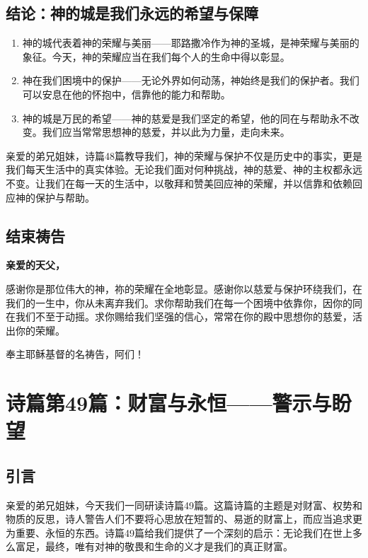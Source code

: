 \documentclass[a4paper, 12pt]{article}
\begin{document}
\subsection*{结论：神的城是我们永远的希望与保障}
\begin{enumerate}
    \item 神的城代表着神的荣耀与美丽——耶路撒冷作为神的圣城，是神荣耀与美丽的象征。今天，神的荣耀应当在我们每个人的生命中得以彰显。

    \item 神在我们困境中的保护——无论外界如何动荡，神始终是我们的保护者。我们可以安息在他的怀抱中，信靠他的能力和帮助。

    \item 神的城是万民的希望——神的慈爱是我们坚定的希望，他的同在与帮助永不改变。我们应当常常思想神的慈爱，并以此为力量，走向未来。

\end{enumerate}

亲爱的弟兄姐妹，诗篇48篇教导我们，神的荣耀与保护不仅是历史中的事实，更是我们每天生活中的真实体验。无论我们面对何种挑战，神的慈爱、神的主权都永远不变。让我们在每一天的生活中，以敬拜和赞美回应神的荣耀，并以信靠和依赖回应神的保护与帮助。

\subsection*{结束祷告}
\textbf{亲爱的天父，}

感谢你是那位伟大的神，祢的荣耀在全地彰显。感谢你以慈爱与保护环绕我们，在我们的一生中，你从未离弃我们。求你帮助我们在每一个困境中依靠你，因你的同在我们不至于动摇。求你赐给我们坚强的信心，常常在你的殿中思想你的慈爱，活出你的荣耀。

奉主耶稣基督的名祷告，阿们！
\newpage
\section{诗篇第49篇：财富与永恒——警示与盼望}

\subsection*{引言}
\hspace{0.6cm}亲爱的弟兄姐妹，今天我们一同研读诗篇49篇。这篇诗篇的主题是对财富、权势和物质的反思，诗人警告人们不要将心思放在短暂的、易逝的财富上，而应当追求更为重要、永恒的东西。诗篇49篇给我们提供了一个深刻的启示：无论我们在世上多么富足，最终，唯有对神的敬畏和生命的义才是我们的真正财富。
\end{document}
